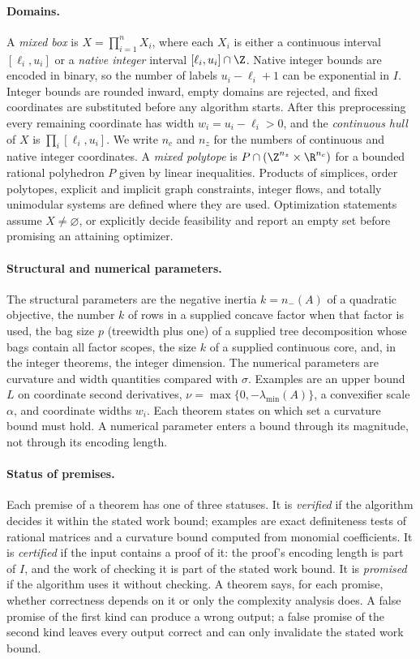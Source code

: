 \paragraph{Domains.}
A \emph{mixed box} is $X=\prod_{i=1}^nX_i$, where each $X_i$ is either a
continuous interval $[\ell_i,u_i]$ or a \emph{native integer} interval
$[\ell_i,u_i]\cap\Z$. Native integer bounds are encoded in binary, so the
number of labels $u_i-\ell_i+1$ can be exponential in $I$. Integer bounds
are rounded inward, empty domains are rejected, and fixed coordinates are
substituted before any algorithm starts. After this preprocessing every
remaining coordinate has width $w_i=u_i-\ell_i>0$, and the
\emph{continuous hull} of $X$ is $\prod_i[\ell_i,u_i]$. We write $n_c$ and
$n_z$ for the numbers of continuous and native integer coordinates. A
\emph{mixed polytope} is $P\cap(\Z^{n_z}\times\R^{n_c})$ for a bounded
rational polyhedron $P$ given by linear inequalities. Products of simplices,
order polytopes, explicit and implicit graph constraints, integer flows, and
totally unimodular systems are defined where they are used.
Optimization statements assume $X\ne\varnothing$, or explicitly decide
feasibility and report an empty set before promising an attaining optimizer.

\paragraph{Structural and numerical parameters.}
The structural parameters are the negative inertia $k=n_-(A)$ of a quadratic
objective, the number $k$ of rows in a supplied concave factor when that
factor is used, the bag size $p$ (treewidth plus one) of a supplied tree
decomposition whose bags contain all factor scopes, the size $k$ of a
supplied continuous core, and, in the integer theorems, the integer
dimension. The numerical parameters are curvature and width quantities
compared with $\sigma$. Examples are an upper bound $L$ on coordinate second
derivatives, $\nu=\max\{0,-\lambda_{\min}(A)\}$, a convexifier scale
$\alpha$, and coordinate widths $w_i$. Each theorem states on which set a
curvature bound must hold. A numerical parameter enters a bound through its
magnitude, not through its encoding length.

\paragraph{Status of premises.}
Each premise of a theorem has one of three statuses. It is \emph{verified}
if the algorithm decides it within the stated work bound; examples are exact
definiteness tests of rational matrices and a curvature bound computed from
monomial coefficients. It is \emph{certified} if the input contains a proof
of it: the proof's encoding length is part of $I$, and the work of checking
it is part of the stated work bound. It is \emph{promised} if the algorithm
uses it without checking. A theorem says, for each promise, whether
correctness depends on it or only the complexity analysis does. A false
promise of the first kind can produce a wrong output; a false promise of the
second kind leaves every output correct and can only invalidate the stated
work bound.

